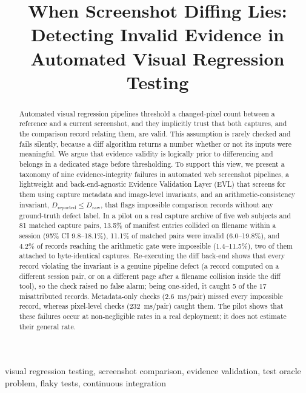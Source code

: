 \documentclass[conference]{IEEEtran}
\newcommand{\Dr}{D_{\mathrm{reported}}}
\newcommand{\Dw}{D_{\mathrm{raw}}}
\begin{document}
\title{When Screenshot Diffing Lies: Detecting Invalid Evidence in Automated Visual Regression Testing}

\author{
}

\maketitle

\begin{abstract}
Automated visual regression pipelines threshold a changed-pixel count between a reference and a current screenshot, and they implicitly trust that both captures, and the comparison record relating them, are valid. This assumption is rarely checked and fails silently, because a diff algorithm returns a number whether or not its inputs were meaningful. We argue that evidence validity is logically prior to differencing and belongs in a dedicated stage before thresholding. To support this view, we present a taxonomy of nine evidence-integrity failures in automated web screenshot pipelines, a lightweight and back-end-agnostic Evidence Validation Layer (EVL) that screens for them using capture metadata and image-level invariants, and an arithmetic-consistency invariant, $\Dr \le \Dw$, that flags impossible comparison records without any ground-truth defect label. In a pilot on a real capture archive of five web subjects and 81 matched capture pairs, 13.5\% of manifest entries collided on filename within a session (95\% CI 9.8--18.1\%), 11.1\% of matched pairs were invalid (6.0--19.8\%), and 4.2\% of records reaching the arithmetic gate were impossible (1.4--11.5\%), two of them attached to byte-identical captures. Re-executing the diff back-end shows that every record violating the invariant is a genuine pipeline defect (a record computed on a different session pair, or on a different page after a filename collision inside the diff tool), so the check raised no false alarm; being one-sided, it caught 5 of the 17 misattributed records. Metadata-only checks (2.6~ms/pair) missed every impossible record, whereas pixel-level checks (232~ms/pair) caught them. The pilot shows that these failures occur at non-negligible rates in a real deployment; it does not estimate their general rate.
\end{abstract}

\begin{IEEEkeywords}
visual regression testing, screenshot comparison, evidence validation, test oracle problem, flaky tests, continuous integration
\end{IEEEkeywords}
\end{document}
